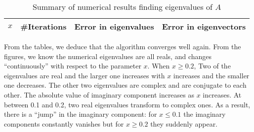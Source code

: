 \documentclass[english, nochinese]{pnote}
\begin{document}
\begin{table}
\centering
\begin{tabular}{|c|c|c|c|}
\hline
$x$ & \#Iterations & Error in eigenvalues & Error in eigenvectors \\
\hline

\end{tabular}
\caption{Summary of numerical results finding eigenvalues of $A$}
\label{Tbl:Eigen}
\end{table}

From the tables, we deduce that the algorithm converges well again. From the figures, we know the numerical eigenvalues are all reals, and changes ``continuously'' with respect to the parameter $x$. When $ x \ge 0.2 $, Two of the eigenvalues are real and the larger one increases with $x$ increases and the smaller one decreases. The other two eigenvalues are complex and are conjugate to each other. The absolute value of imaginary component increases as $x$ increases. At between 0.1 and 0.2, two real eigenvalues transform to complex ones. As a result, there is a ``jump'' in the imaginary component: for $ x \le 0.1 $ the imaginary components constantly vanishes but for $ x \ge 0.2 $ they suddenly appear.
\end{document}

